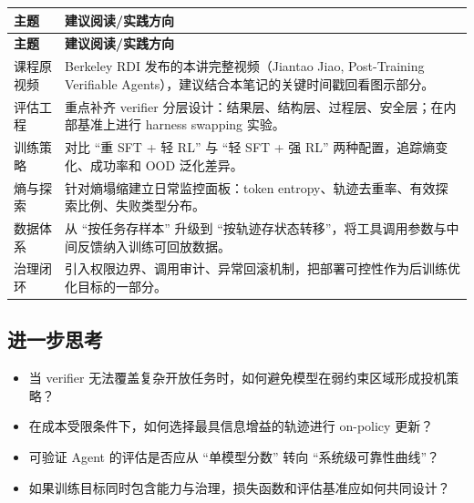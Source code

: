 \documentclass[a4paper]{article}
\begin{document}
\begin{longtable}{p{3.0cm}p{8.0cm}}
\toprule
\textbf{主题} & \textbf{建议阅读/实践方向} \\
\midrule
\endfirsthead
\toprule
\textbf{主题} & \textbf{建议阅读/实践方向} \\
\midrule
\endhead
课程原视频 & Berkeley RDI 发布的本讲完整视频（Jiantao Jiao, Post-Training Verifiable Agents），建议结合本笔记的关键时间戳回看图示部分。 \\
评估工程 & 重点补齐 verifier 分层设计：结果层、结构层、过程层、安全层；在内部基准上进行 harness swapping 实验。 \\
训练策略 & 对比 ``重 SFT + 轻 RL'' 与 ``轻 SFT + 强 RL'' 两种配置，追踪熵变化、成功率和 OOD 泛化差异。 \\
熵与探索 & 针对熵塌缩建立日常监控面板：token entropy、轨迹去重率、有效探索比例、失败类型分布。 \\
数据体系 & 从 ``按任务存样本'' 升级到 ``按轨迹存状态转移''，将工具调用参数与中间反馈纳入训练可回放数据。 \\
治理闭环 & 引入权限边界、调用审计、异常回滚机制，把部署可控性作为后训练优化目标的一部分。 \\
\bottomrule
\end{longtable}

\subsection{进一步思考}
\begin{itemize}
    \item 当 verifier 无法覆盖复杂开放任务时，如何避免模型在弱约束区域形成投机策略？
    \item 在成本受限条件下，如何选择最具信息增益的轨迹进行 on-policy 更新？
    \item 可验证 Agent 的评估是否应从 ``单模型分数'' 转向 ``系统级可靠性曲线''？
    \item 如果训练目标同时包含能力与治理，损失函数和评估基准应如何共同设计？
\end{itemize}

\end{document}
